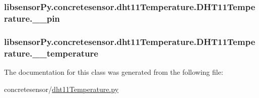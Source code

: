 \subsubsection[{\+\_\+\+\_\+pin}]{\setlength{\rightskip}{0pt plus 5cm}libsensor\+Py.\+concretesensor.\+dht11\+Temperature.\+D\+H\+T11\+Temperature.\+\_\+\+\_\+pin\hspace{0.3cm}{\ttfamily [private]}}\label{classlibsensorPy_1_1concretesensor_1_1dht11Temperature_1_1DHT11Temperature_aaeafc0234ecde2ea71edb2cde10bcc72}
\hypertarget{classlibsensorPy_1_1concretesensor_1_1dht11Temperature_1_1DHT11Temperature_aed45d0818f7f931b0b48176a0477e67a}{}
\subsubsection[{\+\_\+\+\_\+temperature}]{\setlength{\rightskip}{0pt plus 5cm}libsensor\+Py.\+concretesensor.\+dht11\+Temperature.\+D\+H\+T11\+Temperature.\+\_\+\+\_\+temperature\hspace{0.3cm}{\ttfamily [private]}}\label{classlibsensorPy_1_1concretesensor_1_1dht11Temperature_1_1DHT11Temperature_aed45d0818f7f931b0b48176a0477e67a}


The documentation for this class was generated from the following file\+:\begin{DoxyCompactItemize}
\item 
concretesensor/\hyperlink{concretesensor_2dht11Temperature_8py}{dht11\+Temperature.\+py}\end{DoxyCompactItemize}
